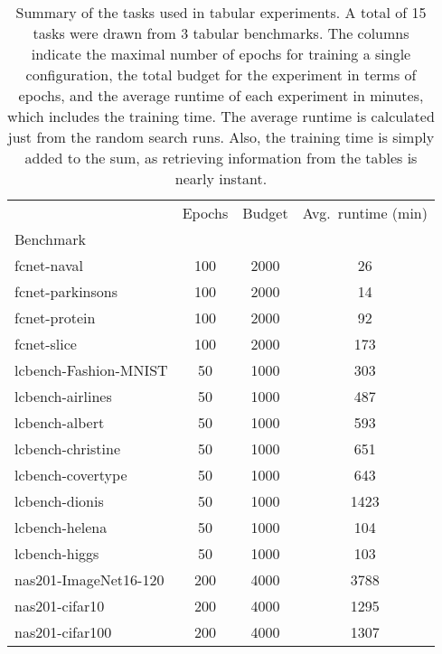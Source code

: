 \begin{table}
\caption{Summary of the tasks used in tabular experiments. A total of 15 tasks were drawn from 3 tabular benchmarks. The columns indicate the maximal number of epochs for training a single configuration, the total budget for the experiment in terms of epochs, and the average runtime of each experiment in minutes, which includes the training time. The average runtime is calculated just from the random search runs. Also, the training time is simply added to the sum, as retrieving information from the tables is nearly instant.}
\label{tab:tab_summary}
\begin{tabular}{lccc}
\toprule
 & Epochs & Budget & Avg.\ runtime (min) \\
Benchmark &  &  &  \\
\midrule
fcnet-naval & 100 & 2000 & 26 \\
fcnet-parkinsons & 100 & 2000 & 14 \\
fcnet-protein & 100 & 2000 & 92 \\
fcnet-slice & 100 & 2000 & 173 \\
lcbench-Fashion-MNIST & 50 & 1000 & 303 \\
lcbench-airlines & 50 & 1000 & 487 \\
lcbench-albert & 50 & 1000 & 593 \\
lcbench-christine & 50 & 1000 & 651 \\
lcbench-covertype & 50 & 1000 & 643 \\
lcbench-dionis & 50 & 1000 & 1423 \\
lcbench-helena & 50 & 1000 & 104 \\
lcbench-higgs & 50 & 1000 & 103 \\
nas201-ImageNet16-120 & 200 & 4000 & 3788 \\
nas201-cifar10 & 200 & 4000 & 1295 \\
nas201-cifar100 & 200 & 4000 & 1307 \\
\bottomrule
\end{tabular}
\end{table}
